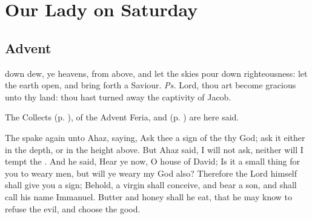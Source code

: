 \section{Our Lady on Saturday}\label{MarySaturday}
\fancyhead[RE,LO]{}
\subsection{Advent}
\introit
{} down dew, ye heavens, from above, and let the skies pour down righteousness: let the earth open, and bring forth a Saviour. \textit{Ps.} Lord, thou art become gracious unto thy land: thou hast turned away the captivity of Jacob.
\begin{rubric}
    The Collects  (p. \pageref{SPMaryInAdvent}), of the Advent Feria, and  (p. \pageref{SPHolyGhost}) are here said.
\end{rubric}
 The  spake again unto Ahaz, saying, Ask thee a sign of the  thy God; ask it either in the depth, or in the height above. But Ahaz said, I will not ask, neither will I tempt the . And he said, Hear ye now, O house of David; Is it a small thing for you to weary men, but will ye weary my God also? Therefore the Lord himself shall give you a sign; Behold, a virgin shall conceive, and bear a son, and shall call his name Immanuel. Butter and honey shall he eat, that he may know to refuse the evil, and choose the good.
